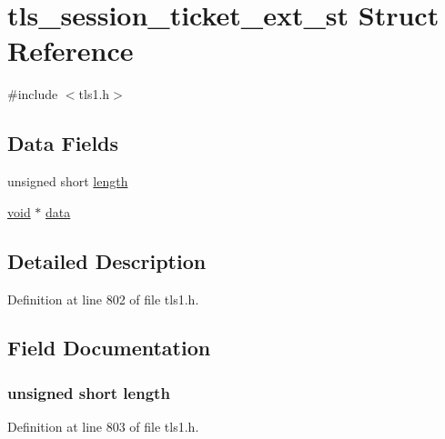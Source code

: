 \hypertarget{structtls__session__ticket__ext__st}{}\section{tls\+\_\+session\+\_\+ticket\+\_\+ext\+\_\+st Struct Reference}
\label{structtls__session__ticket__ext__st}


{\ttfamily \#include $<$tls1.\+h$>$}

\subsection*{Data Fields}
\begin{DoxyCompactItemize}
\item 
unsigned short \hyperlink{structtls__session__ticket__ext__st_a92fb67cb6d873cedc8c09a2d901396a2}{length}
\item 
\hyperlink{hw__4758__cca_8h_afad4d591c7931ff6dc5bf69c76c96aa0}{void} $\ast$ \hyperlink{structtls__session__ticket__ext__st_ac5c5967f62e5c3601479be651a8ed76c}{data}
\end{DoxyCompactItemize}


\subsection{Detailed Description}


Definition at line 802 of file tls1.\+h.



\subsection{Field Documentation}
\subsubsection[{\texorpdfstring{length}{length}}]{\setlength{\rightskip}{0pt plus 5cm}unsigned short length}\hypertarget{structtls__session__ticket__ext__st_a92fb67cb6d873cedc8c09a2d901396a2}{}\label{structtls__session__ticket__ext__st_a92fb67cb6d873cedc8c09a2d901396a2}


Definition at line 803 of file tls1.\+h.

